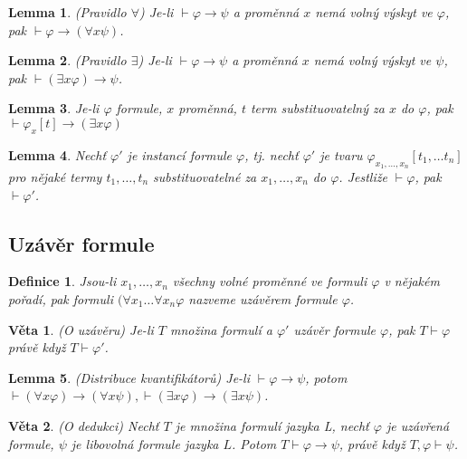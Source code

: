 \documentclass[a4paper, 11pt]{report}
\newtheorem{mydef}{Definice}[chapter]
\newtheorem{veta}{Věta}
\newtheorem{lemma}{Lemma}
\begin{document}
\begin{lemma}
(Pravidlo $\forall$) Je-li $\vdash \varphi \to \psi$ a proměnná $x$ nemá volný výskyt ve $\varphi$, pak $\vdash \varphi \to (\forall x \psi)$.
\end{lemma}

\begin{lemma}
(Pravidlo $\exists$) Je-li $\vdash \varphi \to \psi$ a proměnná $x$ nemá volný výskyt ve $\psi$, pak $\vdash (\exists x \varphi) \to \psi$.
\end{lemma}

\begin{lemma}
Je-li $\varphi$ formule, $x$ proměnná, $t$ term substituovatelný za $x$ do $\varphi$, pak $\vdash \varphi_x[t] \to (\exists x \varphi)$
\end{lemma}

\begin{lemma}
Nechť $\varphi'$ je instancí formule $\varphi$, tj. nechť $\varphi'$ je tvaru $\varphi_{x_1, \dots, x_n}[t_1, \dots t_n]$ pro nějaké termy $t_1, \dots, t_n$ substituovatelné za $x_1, \dots, x_n$ do $\varphi$. Jestliže $\vdash \varphi$, pak $\vdash \varphi'$.
\end{lemma}

\subsection{Uzávěr formule}
\begin{mydef}
Jsou-li $x_1, \dots, x_n$ všechny volné proměnné ve formuli $\varphi$ v nějakém pořadí, pak formuli $(\forall x_1 \dots \forall x_n \varphi$ nazveme uzávěrem formule $\varphi$.
\end{mydef}

\begin{veta}
(O uzávěru) Je-li $T$ množina formulí a $\varphi'$ uzávěr formule $\varphi$, pak $T \vdash \varphi$ právě když $T \vdash \varphi'$.
\end{veta}

\begin{lemma}
(Distribuce kvantifikátorů) Je-li $\vdash \varphi \to \psi$, potom $\vdash (\forall x \varphi ) \to (\forall x \psi), \vdash (\exists x \varphi) \to (\exists x \psi)$.
\end{lemma}

\begin{veta}
(O dedukci) Nechť $T$ je množina formulí jazyka L, nechť $\varphi$ je uzávřená formule, $\psi$ je libovolná formule jazyka $L$. Potom $T \vdash \varphi \to \psi$, právě když $T, \varphi \vdash \psi$.
\end{veta}
\end{document}
